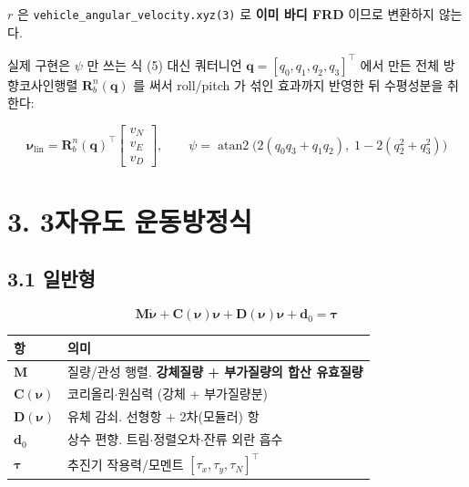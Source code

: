 \documentclass[10pt,a4paper]{article}
\begin{document}
$r$ 은 \texttt{vehicle\_angular\_velocity.xyz(3)} 로 \textbf{이미 바디 FRD} 이므로 변환하지 않는다.

실제 구현은 $\psi$ 만 쓰는 식 (5) 대신 쿼터니언 $\mathbf{q} = [q_0, q_1, q_2, q_3]^\top$ 에서 만든 전체 방향코사인행렬 $\mathbf{R}_b^n(\mathbf{q})$ 를 써서 roll/pitch 가 섞인 효과까지 반영한 뒤 수평성분을 취한다:

\begin{equation*}
\boldsymbol{\nu}_{\text{lin}} = \mathbf{R}_b^n(\mathbf{q})^{\!\top}
\begin{bmatrix} v_N \\ v_E \\ v_D \end{bmatrix}, \qquad
\psi = \operatorname{atan2}\!\big(2(q_0q_3 + q_1q_2),\; 1 - 2(q_2^2 + q_3^2)\big) \tag{6}
\end{equation*}

\section*{3. 3자유도 운동방정식}

\subsection*{3.1 일반형}

\begin{equation*}
\mathbf{M}\dot{\boldsymbol{\nu}} + \mathbf{C}(\boldsymbol{\nu})\boldsymbol{\nu}
+ \mathbf{D}(\boldsymbol{\nu})\boldsymbol{\nu} + \mathbf{d}_0 = \boldsymbol{\tau} \tag{7}
\end{equation*}

\begin{center}\footnotesize\setlength{\tabcolsep}{3pt}
\begin{tabular}{@{}ll@{}}
\toprule
\textbf{항} & \textbf{의미} \\
\midrule
$\mathbf{M}$ & 질량/관성 행렬. \textbf{강체질량 + 부가질량의 합산 유효질량} \\
$\mathbf{C}(\boldsymbol{\nu})$ & 코리올리$\cdot$원심력 (강체 + 부가질량분) \\
$\mathbf{D}(\boldsymbol{\nu})$ & 유체 감쇠. 선형항 + 2차(모듈러) 항 \\
$\mathbf{d}_0$ & 상수 편향. 트림$\cdot$정렬오차$\cdot$잔류 외란 흡수 \\
$\boldsymbol{\tau}$ & 추진기 작용력/모멘트 $[\tau_x, \tau_y, \tau_N]^\top$ \\
\bottomrule
\end{tabular}
\end{center}
\end{document}
